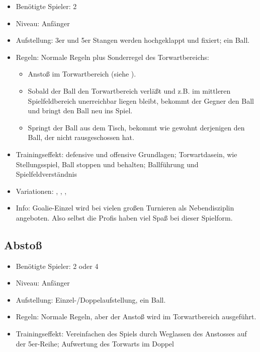 \begin{itemize}
\item Benötigte Spieler: 2
\item Niveau: Anfänger
\item Aufstellung: 3er und 5er Stangen werden hochgeklappt und fixiert; ein Ball.
\item Regeln: Normale Regeln plus Sonderregel des Torwartbereichs: 
  \begin{itemize}
  \item Anstoß im Torwartbereich (siehe ).
  \item Sobald der Ball den Torwartbereich verläßt und z.B. im mittleren Spielfeldbereich unerreichbar liegen bleibt, bekommt der Gegner den Ball und bringt den Ball neu ins Spiel.
  \item Springt der Ball aus dem Tisch, bekommt wie gewohnt derjenigen den Ball, der nicht rausgeschossen hat. 
  \end{itemize}
\item Trainingseffekt: defensive und offensive Grundlagen; Torwartdasein, wie Stellungsspiel, Ball stoppen und behalten; Ballführung und Spielfeldverständnis
\item Variationen: , , , 
\item Info: Goalie-Einzel wird bei vielen großen Turnieren als Nebendisziplin angeboten. Also selbst die Profis haben viel Spaß bei dieser Spielform.
\end{itemize}


\subsection{Abstoß}
\label{spielformen:sonderregeln:abstoss}

\begin{itemize}
\item Benötigte Spieler: 2 oder 4 
\item Niveau: Anfänger
\item Aufstellung: Einzel-/Doppelaufstellung, ein Ball.
\item Regeln: Normale Regeln, aber der Anstoß wird im Torwartbereich ausgeführt. 
\item Trainingseffekt: Vereinfachen des Spiels durch Weglassen des Anstosses auf der 5er-Reihe; Aufwertung des Torwarts im Doppel
\end{itemize}


